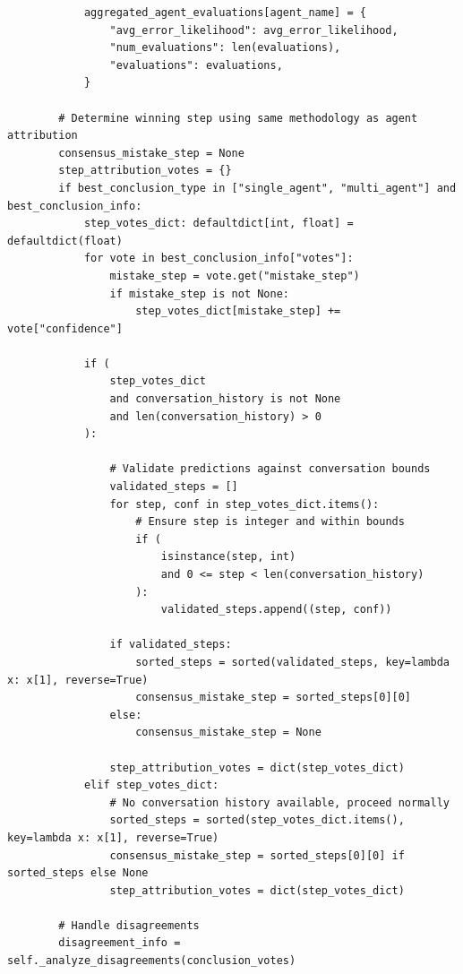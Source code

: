 \documentclass{article}
\begin{document}
\begin{lstlisting}
            aggregated_agent_evaluations[agent_name] = {
                "avg_error_likelihood": avg_error_likelihood,
                "num_evaluations": len(evaluations),
                "evaluations": evaluations,
            }

        # Determine winning step using same methodology as agent attribution
        consensus_mistake_step = None
        step_attribution_votes = {}
        if best_conclusion_type in ["single_agent", "multi_agent"] and best_conclusion_info:
            step_votes_dict: defaultdict[int, float] = defaultdict(float)
            for vote in best_conclusion_info["votes"]:
                mistake_step = vote.get("mistake_step")
                if mistake_step is not None:
                    step_votes_dict[mistake_step] += vote["confidence"]

            if (
                step_votes_dict
                and conversation_history is not None
                and len(conversation_history) > 0
            ):

                # Validate predictions against conversation bounds
                validated_steps = []
                for step, conf in step_votes_dict.items():
                    # Ensure step is integer and within bounds
                    if (
                        isinstance(step, int)
                        and 0 <= step < len(conversation_history)
                    ):
                        validated_steps.append((step, conf))

                if validated_steps:
                    sorted_steps = sorted(validated_steps, key=lambda x: x[1], reverse=True)
                    consensus_mistake_step = sorted_steps[0][0]
                else:
                    consensus_mistake_step = None

                step_attribution_votes = dict(step_votes_dict)
            elif step_votes_dict:
                # No conversation history available, proceed normally
                sorted_steps = sorted(step_votes_dict.items(), key=lambda x: x[1], reverse=True)
                consensus_mistake_step = sorted_steps[0][0] if sorted_steps else None
                step_attribution_votes = dict(step_votes_dict)

        # Handle disagreements
        disagreement_info = self._analyze_disagreements(conclusion_votes)


\end{lstlisting}
\end{document}
